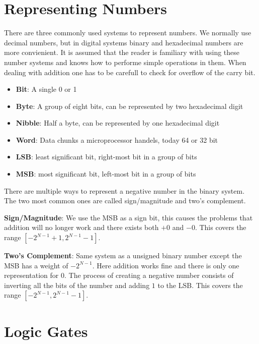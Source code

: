 \pagebreak

\section{Representing Numbers}

There are three commonly used systems to represent numbers. We normally use decimal numbers, but
in digital systems binary and hexadecimal numbers are more convienient. It is assumed that the reader
is familiary with using these number systems and knows how to performe simple operations in them. When
dealing with addition one has to be carefull to check for overflow of the carry bit.

\begin{satz}
    \begin{itemize}
        \item \textbf{Bit}: A single 0 or 1
        \item \textbf{Byte}: A group of eight bits, can be represented by two hexadecimal digit
        \item \textbf{Nibble}: Half a byte, can be represented by one hexadecimal digit
        \item \textbf{Word}: Data chunks a microprocessor handels, today 64 or 32 bit
        \item \textbf{LSB}: least significant bit, right-most bit in a group of bits
        \item \textbf{MSB}: most significant bit, left-most bit in a group of bits
    \end{itemize}
\end{satz}

There are multiple ways to represent a negative number in the binary system. The two most common ones are
called sign/magnitude and two's complement.

\textbf{Sign/Magnitude}: We use the MSB as a sign bit, this causes the problems that addition will no longer work
and there exists both $+0$ and $-0$. This covers the range $[-2^{N-1}+1, 2^{N-1}-1]$.

\textbf{Two's Complement}: Same system as a unsigned binary number except the MSB has a weight of $-2^{N-1}$.
Here addition works fine and there is only one representation for $0$. The process of creating a negative number
consists of inverting all the bits of the number and adding $1$ to the LSB. This covers the range $[-2^{N-1}, 2^{N-1}-1]$.

\section{Logic Gates}


